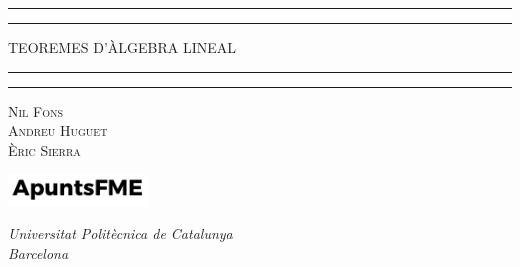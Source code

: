 \newcommand{\plogo}{\fbox{$\mathcal{PL}$}} %
{

    \centering %

    \scshape %

    \rule{\textwidth}{1.6pt}\vspace*{-\baselineskip}\vspace*{2pt} %
    \rule{\textwidth}{0.4pt} %

    \vspace{0.40\baselineskip} %

    {\LARGE TEOREMES D'ÀLGEBRA LINEAL} %

    \vspace{0.01\baselineskip} %

    \rule{\textwidth}{0.4pt}\vspace*{-\baselineskip}\vspace{3.2pt} %
    \rule{\textwidth}{1.6pt} %

    \vspace{0.5\baselineskip} %

    {\scshape\large Nil Fons \\ Andreu Huguet \\ Èric Sierra\\} %

    \vspace{1.5\baselineskip} %

    \includegraphics[width=3.7cm]{../logo.pdf}

    \vspace{-0.3\baselineskip} %
    
    \textit{Universitat Politècnica de Catalunya \\ Barcelona} %
        

    \mydate %

}
